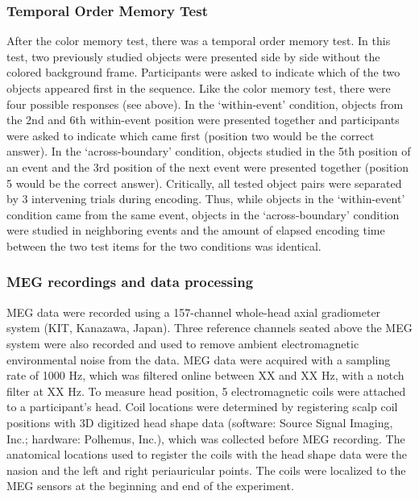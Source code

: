 \subsubsection{Temporal Order Memory
Test}\label{temporal-order-memory-test}

After the color memory test, there was a temporal order memory test. In
this test, two previously studied objects were presented side by side
without the colored background frame. Participants were asked to
indicate which of the two objects appeared first in the sequence. Like
the color memory test, there were four possible responses (see above).
In the `within-event' condition, objects from the 2nd and 6th
within-event position were presented together and participants were
asked to indicate which came first (position two would be the correct
answer). In the `across-boundary' condition, objects studied in the 5th
position of an event and the 3rd position of the next event were
presented together (position 5 would be the correct answer). Critically,
all tested object pairs were separated by 3 intervening trials during
encoding. Thus, while objects in the `within-event' condition came from
the same event, objects in the `across-boundary' condition were studied
in neighboring events and the amount of elapsed encoding time between
the two test items for the two conditions was identical.

\subsubsection{MEG recordings and data
processing}\label{meg-recordings-and-data-processing}

MEG data were recorded using a 157-channel whole-head axial gradiometer
system (KIT, Kanazawa, Japan). Three reference channels seated above the
MEG system were also recorded and used to remove ambient electromagnetic
environmental noise from the data. MEG data were acquired with a
sampling rate of 1000 Hz, which was filtered online between XX and XX
Hz, with a notch filter at XX Hz. To measure head position, 5
electromagnetic coils were attached to a participant's head. Coil
locations were determined by registering scalp coil positions with 3D
digitized head shape data (software: Source Signal Imaging, Inc.;
hardware: Polhemus, Inc.), which was collected before MEG recording. The
anatomical locations used to register the coils with the head shape data
were the nasion and the left and right periauricular points. The coils
were localized to the MEG sensors at the beginning and end of the
experiment.

